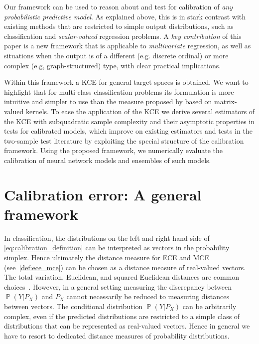 \documentclass{article}
\DeclareMathOperator{\Prob}{\mathbb{P}}
\begin{document}
Our framework can be used to reason about and test for calibration of \emph{any
probabilistic predictive model}. As explained above, this is in stark contrast with
existing methods
that are restricted to simple output distributions, such as classification
and \emph{scalar-valued} regression problems. 
A \emph{key contribution} of this paper is a new framework that
is applicable to \emph{multivariate} regression, as well as situations when the output is of a
different (e.g. discrete ordinal) or more complex (e.g, graph-structured) type, with clear practical implications.

Within this framework a KCE for general target spaces is obtained. We want to highlight
that for multi-class classification problems its formulation is more intuitive and
simpler to use than the measure proposed by \citet{Widmann2019} based on matrix-valued
kernels.
To ease the application of the KCE we derive several
estimators of the KCE with subquadratic sample complexity and their asymptotic properties
in tests for calibrated models, which improve on existing estimators and tests in the
two-sample test literature by exploiting the special structure of the calibration
framework. Using the proposed framework, we numerically evaluate the calibration of neural
network models and ensembles of such models.

\section{Calibration error: A general framework}

In classification, the distributions on the left and right hand side of
\cref{eq:calibration_definition} can be interpreted as vectors in the probability
simplex. Hence ultimately the distance measure for ECE and MCE
(see~\cref{def:ece_mce}) can be chosen as a distance measure of real-valued vectors.
The total variation, Euclidean, and squared Euclidean distances
are common choices~\citep{Guo2017,Kull2019,Vaicenavicius2019}.
However, in a general setting measuring the discrepancy between
$\Prob(Y|P_X)$ and $P_X$ cannot necessarily be reduced to measuring
distances between vectors. The conditional distribution $\Prob(Y|P_X)$ can
be arbitrarily complex, even if the predicted distributions are restricted to a
simple class of distributions that can be represented as real-valued
vectors. Hence in general we have to resort to dedicated distance measures
of probability distributions.
\end{document}
